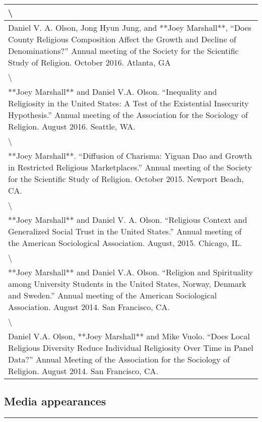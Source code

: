 \documentclass[
]{article}
\begin{document}
\begin{tabular}{l}
\hline
\textbackslash{}\\
\hline
Daniel V. A. Olson, Jong Hyun Jung, and **Joey Marshall**, “Does County Religious Composition Affect the Growth and Decline of Denominations?” Annual meeting of the Society for the Scientific Study of Religion. October 2016. Atlanta, GA\\
\hline
\textbackslash{}\\
\hline
**Joey Marshall** and Daniel V.A. Olson. “Inequality and Religiosity in the United States: A Test of the Existential Insecurity Hypothesis.” Annual meeting of the Association for the Sociology of Religion. August 2016. Seattle, WA.\\
\hline
\textbackslash{}\\
\hline
**Joey Marshall**. “Diffusion of Charisma: Yiguan Dao and Growth in Restricted Religious Marketplaces.” Annual meeting of the Society for the Scientific Study of Religion. October 2015. Newport Beach, CA.\\
\hline
\textbackslash{}\\
\hline
**Joey Marshall** and Daniel V. A. Olson. “Religious Context and Generalized Social Trust in the United States.” Annual meeting of the American Sociological Association. August, 2015. Chicago, IL.\\
\hline
\textbackslash{}\\
\hline
**Joey Marshall** and Daniel V.A. Olson. “Religion and Spirituality among University Students in the United States, Norway, Denmark and Sweden.” Annual meeting of the American Sociological Association. August 2014. San Francisco, CA.\\
\hline
\textbackslash{}\\
\hline
Daniel V.A. Olson, **Joey Marshall** and Mike Vuolo. “Does Local Religious Diversity Reduce Individual Religiosity Over Time in Panel Data?” Annual Meeting of the Association for the Sociology of Religion. August 2014. San Francisco, CA.\\
\hline
\end{tabular}

\hypertarget{media-appearances}{%
\subsection{Media appearances}\label{media-appearances}}

\begin{center}\rule{0.5\linewidth}{\linethickness}\end{center}
\end{document}
